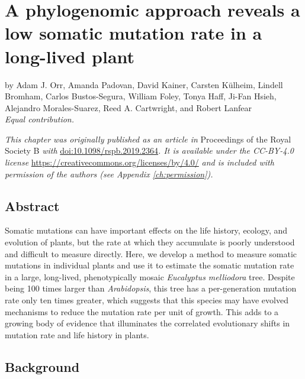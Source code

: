 \chapter{A phylogenomic approach reveals a low somatic mutation rate in a long-lived plant}
\label{ch:phylogenomic}

\noindent by Adam J. Orr\textsuperscript{\dagger}, Amanda Padovan\textsuperscript{\dagger}, David Kainer\textsuperscript{\dagger}, Carsten Külheim, Lindell Bromham, Carlos Bustos-Segura, William Foley, Tonya Haff, Ji-Fan Hsieh, Alejandro Morales-Suarez, Reed A. Cartwright, and Robert Lanfear
\\
\hspace*{\fill}\textit{\dagger Equal contribution.}

\vspace{\baselineskip}

\textit{This chapter was originally published as an article in} Proceedings of the Royal Society B \textit{with }\url{doi:10.1098/rspb.2019.2364}\textit{. It is available under the CC-BY-4.0 license }\url{https://creativecommons.org/licenses/by/4.0/}\textit{ and is included with permission of the authors (see Appendix \ref{ch:permission}).}

\section{Abstract}
Somatic mutations can have important effects on the life history, ecology, and evolution of plants, but the rate at which they accumulate is poorly understood and difficult to measure directly. Here, we develop a method to measure somatic mutations in individual plants and use it to estimate the somatic mutation rate in a large, long-lived, phenotypically mosaic \textit{Eucalyptus melliodora} tree. Despite being 100 times larger than \textit{Arabidopsis}, this tree has a per-generation mutation rate only ten times greater, which suggests that this species may have evolved mechanisms to reduce the mutation rate per unit of growth. This adds to a growing body of evidence that illuminates the correlated evolutionary shifts in mutation rate and life history in plants.

\section{Background}

